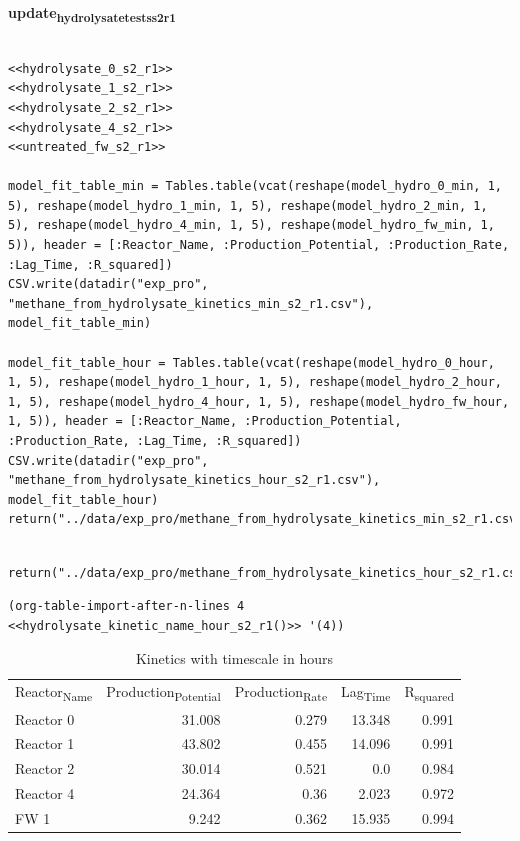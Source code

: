 \documentclass[11pt]{article}
\begin{document}
\textbf{update\textsubscript{hydrolysate}\textsubscript{tests}\textsubscript{s2}\textsubscript{r1}}
\begin{verbatim}

<<hydrolysate_0_s2_r1>>
<<hydrolysate_1_s2_r1>>
<<hydrolysate_2_s2_r1>>
<<hydrolysate_4_s2_r1>>
<<untreated_fw_s2_r1>>

model_fit_table_min = Tables.table(vcat(reshape(model_hydro_0_min, 1, 5), reshape(model_hydro_1_min, 1, 5), reshape(model_hydro_2_min, 1, 5), reshape(model_hydro_4_min, 1, 5), reshape(model_hydro_fw_min, 1, 5)), header = [:Reactor_Name, :Production_Potential, :Production_Rate, :Lag_Time, :R_squared])
CSV.write(datadir("exp_pro", "methane_from_hydrolysate_kinetics_min_s2_r1.csv"), model_fit_table_min)

model_fit_table_hour = Tables.table(vcat(reshape(model_hydro_0_hour, 1, 5), reshape(model_hydro_1_hour, 1, 5), reshape(model_hydro_2_hour, 1, 5), reshape(model_hydro_4_hour, 1, 5), reshape(model_hydro_fw_hour, 1, 5)), header = [:Reactor_Name, :Production_Potential, :Production_Rate, :Lag_Time, :R_squared])
CSV.write(datadir("exp_pro", "methane_from_hydrolysate_kinetics_hour_s2_r1.csv"), model_fit_table_hour)
return("../data/exp_pro/methane_from_hydrolysate_kinetics_min_s2_r1.csv")
\end{verbatim}

\begin{verbatim}

return("../data/exp_pro/methane_from_hydrolysate_kinetics_hour_s2_r1.csv")
\end{verbatim}

\begin{verbatim}
(org-table-import-after-n-lines 4 <<hydrolysate_kinetic_name_hour_s2_r1()>> '(4))
\end{verbatim}

\begin{table}[htbp]
\caption{Kinetics with timescale in hours}
\centering
\begin{tabular}{lrrrr}
Reactor\textsubscript{Name} & Production\textsubscript{Potential} & Production\textsubscript{Rate} & Lag\textsubscript{Time} & R\textsubscript{squared}\\[0pt]
Reactor 0 & 31.008 & 0.279 & 13.348 & 0.991\\[0pt]
Reactor 1 & 43.802 & 0.455 & 14.096 & 0.991\\[0pt]
Reactor 2 & 30.014 & 0.521 & 0.0 & 0.984\\[0pt]
Reactor 4 & 24.364 & 0.36 & 2.023 & 0.972\\[0pt]
FW 1 & 9.242 & 0.362 & 15.935 & 0.994\\[0pt]
\end{tabular}
\end{table}
\end{document}
